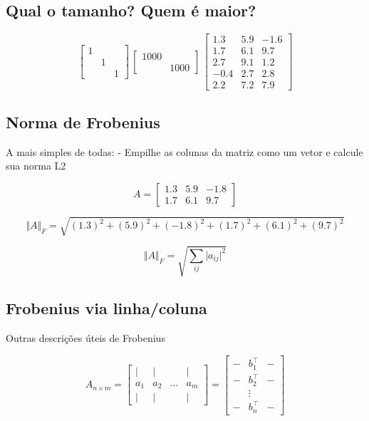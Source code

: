 \documentclass[
  letterpaper,
  DIV=11,
  numbers=noendperiod]{scrartcl}
\begin{document}
\hypertarget{qual-o-tamanho-quem-uxe9-maior}{%
\subsection{Qual o tamanho? Quem é
maior?}\label{qual-o-tamanho-quem-uxe9-maior}}

\[\begin{bmatrix}1 &&\\ &1&\\&&1\end{bmatrix}\,  \begin{bmatrix}1000 &\\ &1000\end{bmatrix}\, \begin{bmatrix}1.3 &5.9&-1.6\\ 1.7&6.1&9.7\\2.7&9.1&1.2\\-0.4&2.7&2.8\\2.2&7.2&7.9\end{bmatrix}\]

\hypertarget{norma-de-frobenius}{%
\subsection{Norma de Frobenius}\label{norma-de-frobenius}}

A mais simples de todas: - Empilhe as colunas da matriz como um vetor e
calcule sua norma L2

\[A = \begin{bmatrix}1.3&5.9&-1.8\\1.7&6.1&9.7\end{bmatrix}\]

\[\Vert A\Vert_F = \sqrt{(1.3)^2+(5.9)^2+(-1.8)^2+(1.7)^2+(6.1)^2+(9.7)^2}\]

\[\Vert A\Vert_F = \sqrt{\sum_{ij}\vert a_{ij}\vert^2}\]

\hypertarget{frobenius-via-linhacoluna}{%
\subsection{Frobenius via
linha/coluna}\label{frobenius-via-linhacoluna}}

Outras descrições úteis de Frobenius

\[A_{n\times m} = \begin{bmatrix}\vert&\vert&&\vert\\ a_1&a_2&\ldots&a_m\\\vert&\vert&&\vert\end{bmatrix} = \begin{bmatrix}-&b_1^\top&-\\-&b_2^\top&-\\&\vdots&\\ -&b_n^\top&-\end{bmatrix} \]
\end{document}
